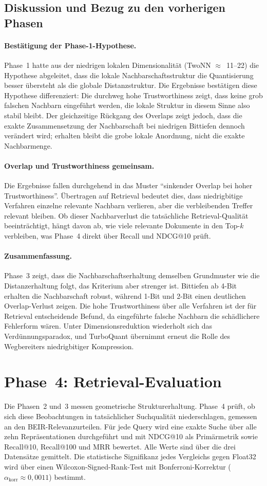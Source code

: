 \subsection{Diskussion und Bezug zu den vorherigen Phasen}
%
\paragraph{Bestätigung der Phase-1-Hypothese.}
Phase~1 hatte aus der niedrigen lokalen Dimensionalität (TwoNN $\approx$~11--22) die Hypothese abgeleitet, dass die lokale Nachbarschaftsstruktur die Quantisierung besser übersteht als die globale Distanzstruktur.
Die Ergebnisse bestätigen diese Hypothese differenziert: Die durchweg hohe Trustworthiness zeigt, dass keine grob falschen Nachbarn eingeführt werden, die lokale Struktur in diesem Sinne also stabil bleibt.
Der gleichzeitige Rückgang des Overlaps zeigt jedoch, dass die exakte Zusammensetzung der Nachbarschaft bei niedrigen Bittiefen dennoch verändert wird; erhalten bleibt die grobe lokale Anordnung, nicht die exakte Nachbarmenge.
%
\paragraph{Overlap und Trustworthiness gemeinsam.}
Die Ergebnisse fallen durchgehend in das Muster \enquote{sinkender Overlap bei hoher Trustworthiness}.
Übertragen auf Retrieval bedeutet dies, dass niedrigbitige Verfahren einzelne relevante Nachbarn verlieren, aber die verbleibenden Treffer relevant bleiben.
Ob dieser Nachbarverlust die tatsächliche Retrieval-Qualität beeinträchtigt, hängt davon ab, wie viele relevante Dokumente in den Top-$k$ verbleiben, was Phase~4 direkt über Recall und NDCG@10 prüft.
%
\paragraph{Zusammenfassung.}
Phase~3 zeigt, dass die Nachbarschaftserhaltung demselben Grundmuster wie die Distanzerhaltung folgt, das Kriterium aber strenger ist.
Bittiefen ab 4-Bit erhalten die Nachbarschaft robust, während 1-Bit und 2-Bit einen deutlichen Overlap-Verlust zeigen.
Die hohe Trustworthiness über alle Verfahren ist der für Retrieval entscheidende Befund, da eingeführte falsche Nachbarn die schädlichere Fehlerform wären.
Unter Dimensionsreduktion wiederholt sich das Verdünnungsparadox, und TurboQuant übernimmt erneut die Rolle des Wegbereiters niedrigbitiger Kompression.
%
\section{Phase~4: Retrieval-Evaluation}
\label{sec:ergebnisse_phase4}
%
Die Phasen~2 und~3 messen geometrische Strukturerhaltung.
Phase~4 prüft, ob sich diese Beobachtungen in tatsächlicher Suchqualität niederschlagen, gemessen an den BEIR-Relevanzurteilen.
Für jede Query wird eine exakte Suche über alle zehn Repräsentationen durchgeführt und mit NDCG@10 als Primärmetrik sowie Recall@10, Recall@100 und MRR bewertet.
Alle Werte sind über die drei Datensätze gemittelt.
Die statistische Signifikanz jedes Vergleichs gegen Float32 wird über einen Wilcoxon-Signed-Rank-Test mit Bonferroni-Korrektur ($\alpha_\text{korr} \approx 0{,}0011$) bestimmt.
%
